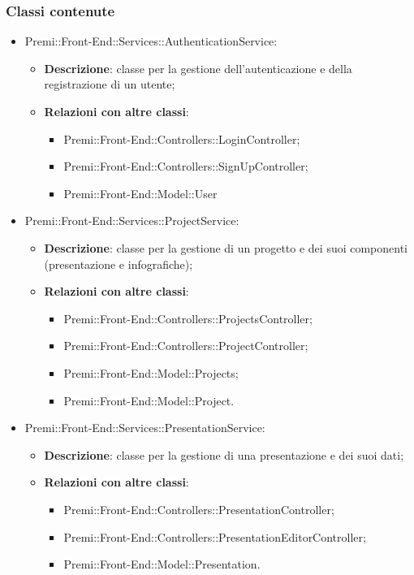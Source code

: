 \subsubsection*{Classi contenute}
\begin{itemize}

    \item Premi::Front-End::Services::AuthenticationService:
	\begin{itemize}
		\item \textbf{Descrizione}: classe per la gestione dell'autenticazione e della registrazione di un utente;
		\item \textbf{Relazioni con altre classi}:
		\begin{itemize}
			\item Premi::Front-End::Controllers::LoginController;
			\item Premi::Front-End::Controllers::SignUpController;
			\item Premi::Front-End::Model::User
		\end{itemize}
	\end{itemize}

    \item Premi::Front-End::Services::ProjectService:
	\begin{itemize}
		\item \textbf{Descrizione}: classe per la gestione di un progetto e dei suoi componenti (presentazione e infografiche);
		\item \textbf{Relazioni con altre classi}:
		\begin{itemize}
			\item Premi::Front-End::Controllers::ProjectsController;
			\item Premi::Front-End::Controllers::ProjectController;
			\item Premi::Front-End::Model::Projects;
			\item Premi::Front-End::Model::Project.
		\end{itemize}
	\end{itemize}

    \item Premi::Front-End::Services::PresentationService:
	\begin{itemize}
		\item \textbf{Descrizione}: classe per la gestione di una presentazione e dei suoi dati;
		\item \textbf{Relazioni con altre classi}:
		\begin{itemize}
			\item Premi::Front-End::Controllers::PresentationController;
			\item Premi::Front-End::Controllers::PresentationEditorController;
			\item Premi::Front-End::Model::Presentation.
		\end{itemize}
	\end{itemize}


\end{itemize}
